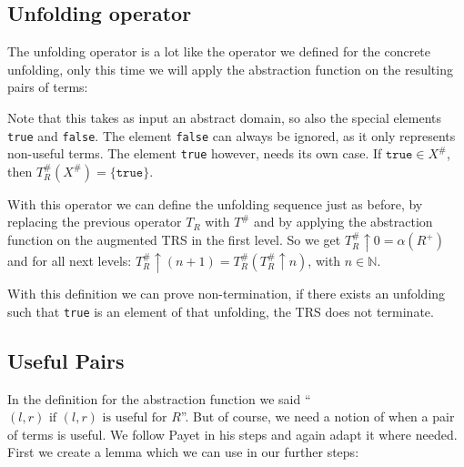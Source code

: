 \subsection*{Unfolding operator}
The unfolding operator is a lot like the operator we defined for the concrete unfolding, only this time we will apply the abstraction function on the resulting pairs of terms:
\begin{center}
\end{center}
Note that this takes as input an abstract domain, so also the special elements \texttt{true} and \texttt{false}. The element \texttt{false} can always be ignored, as it only represents non-useful terms. The element \texttt{true} however, needs its own case. If $\texttt{true} \in X^{\#}$, then $T_R^{\#}(X^{\#}) = \{ \texttt{true} \}$. 

With this operator we can define the unfolding sequence just as before, by replacing the previous operator $T_R$ with $T^{\#}$ and by applying the abstraction function on the augmented TRS in the first level. So we get $T^{\#}_R \uparrow 0 = \alpha(R^+)$ and for all next levels: $T^{\#}_R \uparrow (n+1) = T^{\#}_R(T^{\#}_R \uparrow n)$, with $n \in \mathbb{N}$. 

With this definition we can prove non-termination, if there exists an unfolding such that \texttt{true} is an element of that unfolding, the TRS does not terminate. 

\subsection*{Useful Pairs}
In the definition for the abstraction function we said ``$(l, r) \text{ if } (l, r) \text{ is useful for } R$''. But of course, we need a notion of when a pair of terms is useful. We follow Payet in his steps and again adapt it where needed. First we create a lemma which we can use in our further steps: 

